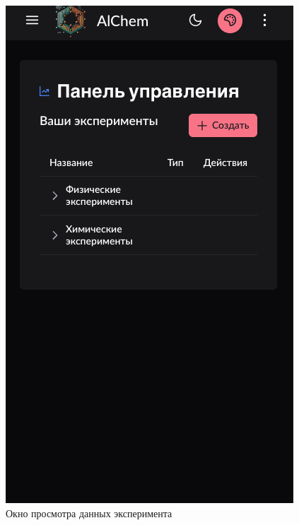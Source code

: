 \begin{figure}[H]
\centering
\begin{minipage}{0.45\linewidth}
\centering
\includegraphics[width=\linewidth]{img/mobile_version.png}
\caption{Окно просмотра данных эксперимента}
\label{pic:mobile_version}
\end{minipage}\hfill
\begin{minipage}{0.45\linewidth}
\centering

\end{minipage}
\end{figure}
